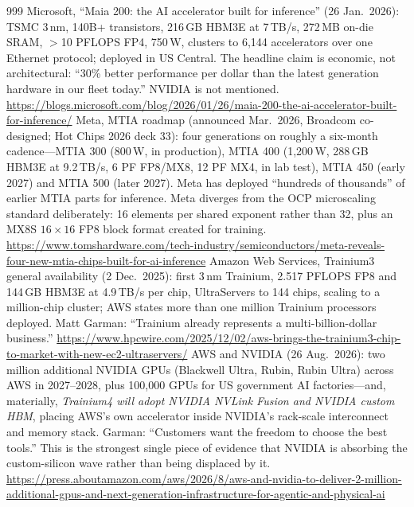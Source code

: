 \begin{thebibliography}{999}
 Microsoft, ``Maia 200: the AI accelerator built for inference'' (26 Jan.\ 2026): TSMC 3\,nm, 140B+ transistors, 216\,GB HBM3E at 7\,TB/s, 272\,MB on-die SRAM, $>$10 PFLOPS FP4, 750\,W, clusters to 6{,}144 accelerators over one Ethernet protocol; deployed in US Central. The headline claim is economic, not architectural: ``30\% better performance per dollar than the latest generation hardware in our fleet today.'' NVIDIA is not mentioned. \url{https://blogs.microsoft.com/blog/2026/01/26/maia-200-the-ai-accelerator-built-for-inference/}
 Meta, MTIA roadmap (announced Mar.\ 2026, Broadcom co-designed; Hot Chips 2026 deck 33): four generations on roughly a six-month cadence---MTIA 300 (800\,W, in production), MTIA 400 (1{,}200\,W, 288\,GB HBM3E at 9.2\,TB/s, 6 PF FP8/MX8, 12 PF MX4, in lab test), MTIA 450 (early 2027) and MTIA 500 (later 2027). Meta has deployed ``hundreds of thousands'' of earlier MTIA parts for inference. Meta diverges from the OCP microscaling standard deliberately: 16 elements per shared exponent rather than 32, plus an MX8S $16\times16$ FP8 block format created for training. \url{https://www.tomshardware.com/tech-industry/semiconductors/meta-reveals-four-new-mtia-chips-built-for-ai-inference}
 Amazon Web Services, Trainium3 general availability (2 Dec.\ 2025): first 3\,nm Trainium, 2.517 PFLOPS FP8 and 144\,GB HBM3E at 4.9\,TB/s per chip, UltraServers to 144 chips, scaling to a million-chip cluster; AWS states more than one million Trainium processors deployed. Matt Garman: ``Trainium already represents a multi-billion-dollar business.'' \url{https://www.hpcwire.com/2025/12/02/aws-brings-the-trainium3-chip-to-market-with-new-ec2-ultraservers/}
 AWS and NVIDIA (26 Aug.\ 2026): two million additional NVIDIA GPUs (Blackwell Ultra, Rubin, Rubin Ultra) across AWS in 2027--2028, plus 100{,}000 GPUs for US government AI factories---and, materially, \emph{Trainium4 will adopt NVIDIA NVLink Fusion and NVIDIA custom HBM}, placing AWS's own accelerator inside NVIDIA's rack-scale interconnect and memory stack. Garman: ``Customers want the freedom to choose the best tools.'' This is the strongest single piece of evidence that NVIDIA is absorbing the custom-silicon wave rather than being displaced by it. \url{https://press.aboutamazon.com/aws/2026/8/aws-and-nvidia-to-deliver-2-million-additional-gpus-and-next-generation-infrastructure-for-agentic-and-physical-ai}

\end{thebibliography}
